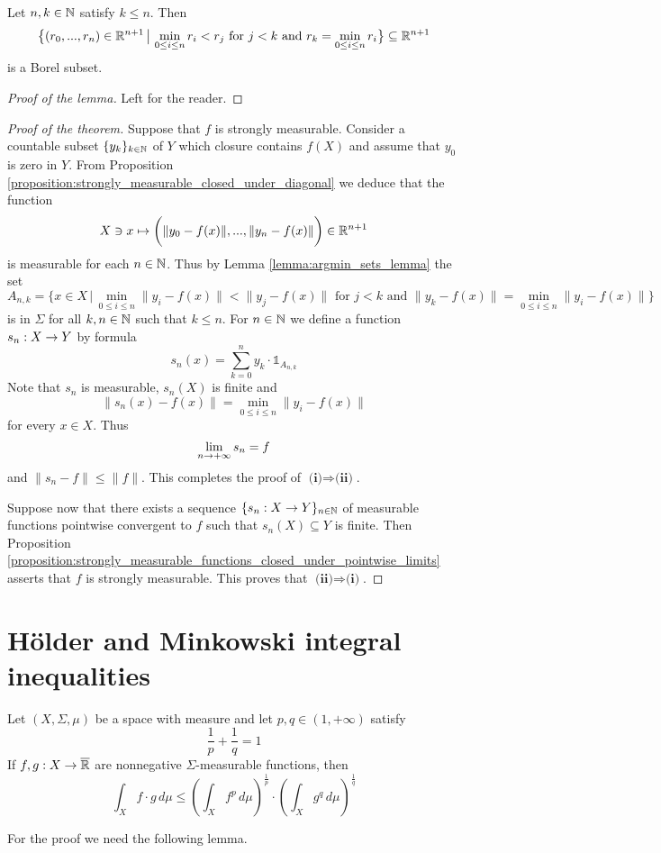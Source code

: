 \begin{lemma}\label{lemma:argmin_sets_lemma}
    Let $n,k\in {\mathbb N}$ satisfy $k \leq n$. Then
    $$\big\{(r_0,...,r_n)\in {\mathbb R}^{n+1}\,\big|\,\min_{0\leq i\leq n} r_i < r_j\mbox{ for }j < k\mbox{ and }r_k = \min_{0\leq i\leq n} r_i\big\} \subseteq {\mathbb R}^{n+1}$$
    is a Borel subset.
\end{lemma}
\begin{proof}[Proof of the lemma]
    Left for the reader.
\end{proof}

\begin{proof}[Proof of the theorem]
    Suppose that $f$ is strongly measurable. Consider a countable subset $\{y_k\}_{k\in {\mathbb N}}$ of $Y$ which closure contains $f(X)$ and assume that $y_0$ is zero in $Y$. From Proposition \ref{proposition:strongly_measurable_closed_under_diagonal} we deduce that the function
    $$X\ni x\mapsto \bigg(\lVert y_0 - f(x)\rVert,...,\lVert y_n - f(x)\rVert \bigg)\in {\mathbb R}^{n+1}$$
    is measurable for each $n \in {\mathbb N}$. Thus by Lemma \ref{lemma:argmin_sets_lemma} the set
    $$A_{n,k} = \big\{x \in X\,\big|\,\min_{0\leq i\leq n}\lVert y_i - f(x)\rVert < \lVert y_j - f(x)\rVert \mbox{ for }j < k\mbox{ and }\lVert y_k - f(x)\rVert = \min_{0\leq i\leq n}\lVert y_i - f(x)\rVert\big\}$$
    is in $\Sigma$ for all $k,n\in {\mathbb N}$ such that $k \leq n$. For $n\in {\mathbb N}$ we define a function $s_n:X\rightarrow Y$ by formula
    $$s_n(x) = \sum_{k=0}^ny_k\cdot \mathbb{1}_{A_{n,k}}$$
    Note that $s_n$ is measurable, $s_n(X)$ is finite and
    $$\lVert s_n(x) - f(x)\rVert = \min_{0\leq i\leq n}\lVert y_i - f(x)\rVert$$
    for every $x \in X$. Thus
    $$\lim_{n\rightarrow +\infty}s_n = f$$
    and $\lVert s_n - f\rVert \leq  \lVert f\rVert$. This completes the proof of $\textbf{(i)}\Rightarrow \textbf{(ii)}$.

    Suppose now that there exists a sequence $\{s_n:X\rightarrow Y\}_{n\in {\mathbb N}}$ of measurable functions pointwise convergent to $f$ such that $s_n(X)\subseteq Y$ is finite. Then Proposition \ref{proposition:strongly_measurable_functions_closed_under_pointwise_limits} asserts that $f$ is strongly measurable. This proves that $\textbf{(ii)}\Rightarrow \textbf{(i)}$.
\end{proof}

\section{H{\"o}lder and Minkowski integral inequalities}

\begin{theorem}[H{\"o}lder]\label{theorem:holder_inequality}
    Let $(X,\Sigma,\mu)$ be a space with measure and let $p,q \in (1,+\infty)$ satisfy
    $$\frac{1}{p} + \frac{1}{q} = 1$$
    If $f,g:X\rightarrow \overline{{\mathbb R}}$ are nonnegative $\Sigma$-measurable functions, then
    $$\int_X f\cdot g\,d\mu \leq \left(\int_X f^p\,d\mu\right)^{\frac{1}{p}}\cdot \left(\int_X g^q\,d\mu\right)^{\frac{1}{q}} $$
\end{theorem}
\noindent
For the proof we need the following lemma.

